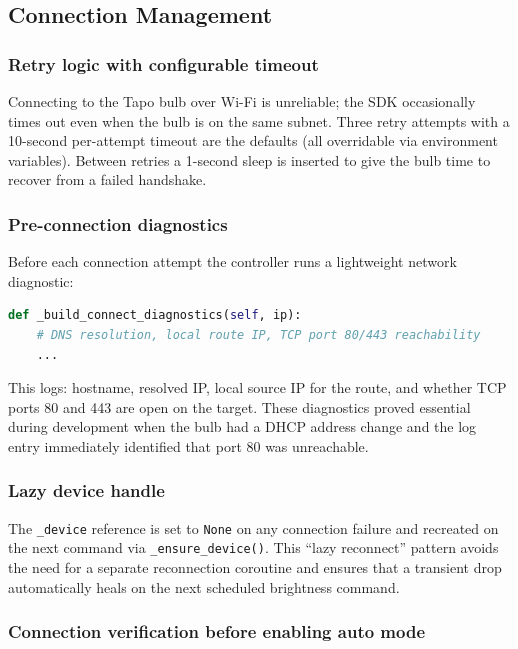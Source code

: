\documentclass[12pt,letterpaper]{article}
\begin{document}
\subsection{Connection Management}

\subsubsection{Retry logic with configurable timeout}

Connecting to the Tapo bulb over Wi-Fi is unreliable; the SDK occasionally
times out even when the bulb is on the same subnet. Three retry attempts with
a 10-second per-attempt timeout are the defaults (all overridable via
environment variables). Between retries a 1-second sleep is inserted to give
the bulb time to recover from a failed handshake.

\subsubsection{Pre-connection diagnostics}

Before each connection attempt the controller runs a lightweight network
diagnostic:

\begin{lstlisting}[language=Python, caption={Network diagnostics before connect}]
def _build_connect_diagnostics(self, ip):
    # DNS resolution, local route IP, TCP port 80/443 reachability
    ...
\end{lstlisting}

This logs: hostname, resolved IP, local source IP for the route, and whether
TCP ports 80 and 443 are open on the target. These diagnostics proved essential
during development when the bulb had a DHCP address change and the log entry
immediately identified that port 80 was unreachable.

\subsubsection{Lazy device handle}

The \texttt{\_device} reference is set to \texttt{None} on any connection
failure and recreated on the next command via \texttt{\_ensure\_device()}.
This ``lazy reconnect'' pattern avoids the need for a separate reconnection
coroutine and ensures that a transient drop automatically heals on the next
scheduled brightness command.

\subsubsection{Connection verification before enabling auto mode}
\end{document}
